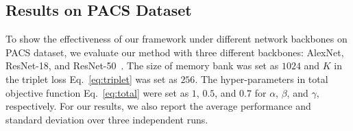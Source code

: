 \begin{table*} [!t]
	\centering
	\caption{Domain generalization results on \textbf{PACS} dataset with object recognition accuracy (\%) using \textbf{ResNet} backbones. 
		The top results are highlighted in \textbf{bold}.}
	\label{tab:results-PACS-resnet}
\end{table*}

\subsection{Results on PACS Dataset}


To show the effectiveness of our framework under different network backbones on PACS dataset, we evaluate our method with three different backbones: AlexNet, ResNet-18, and ResNet-50~\cite{He_2016_CVPR}.
The size of memory bank was set as $1024$ and $K$ in the triplet loss Eq.~\eqref{eq:triplet} was set as $256$.
The hyper-parameters in total objective function Eq.~\eqref{eq:total} were set as $1$, $0.5$, and $0.7$ for $\alpha$, $\beta$, and $\gamma$, respectively.
For our results, we also report the average performance and standard deviation over three independent runs.

